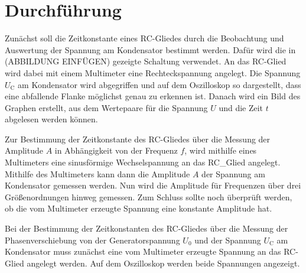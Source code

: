\section{Durchführung}
\label{sec:Durchführung}
Zunächst soll die Zeitkonstante eines RC-Gliedes durch die Beobachtung und Auswertung
der Spannung am Kondensator bestimmt werden. Dafür wird die in (ABBILDUNG EINFÜGEN)
gezeigte Schaltung verwendet. An das RC-Glied wird dabei mit einem Multimeter eine
Rechteckspannung angelegt. Die Spannung $U_{\text{C}}$ am Kondensator wird abgegriffen und auf dem
Oszilloskop so dargestellt, dass eine abfallende Flanke möglichst genau zu erkennen ist.
Danach wird ein Bild des Graphen erstellt, aus dem Wertepaare für die Spannung $U$
und die Zeit $t$ abgelesen werden können.


Zur Bestimmung der Zeitkonstante des RC-Gliedes über die Messung der Amplitude $A$ in
Abhängigkeit von der Frequenz $f$, wird mithilfe eines Multimeters eine sinusförmige
Wechselspannung an das RC_Glied angelegt. Mithilfe des Multimeters kann dann die Amplitude
$A$ der Spannung am Kondensator gemessen werden. Nun wird die Amplitude für Frequenzen
über drei Größenordnungen hinweg gemessen. Zum Schluss sollte noch überprüft werden,
ob die vom Multimeter erzeugte Spannung eine konstante Amplitude hat.

Bei der Bestimmung der Zeitkonstanten des RC-Gliedes über die Messung der Phasenverschiebung
von der Generatorspannung $U_{\text{0}}$ und der Spannung $U_{\text{C}}$ am Kondensator
muss zunächst eine vom Multimeter erzeugte Spannung an das RC-Glied angelegt werden.
Auf dem Oszilloskop werden beide Spannungen angezeigt.
